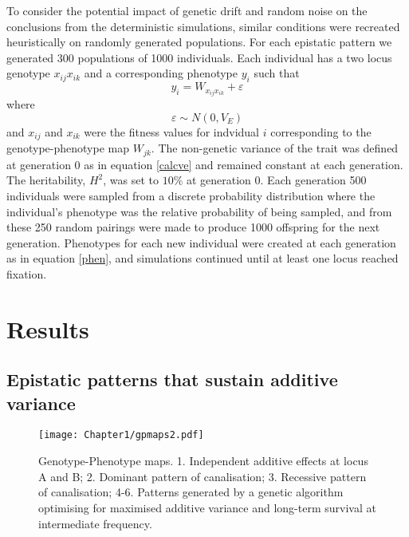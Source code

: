 To consider the potential impact of genetic drift and random noise on the conclusions from the deterministic simulations, similar conditions were recreated heuristically on randomly generated populations. For each epistatic pattern we generated 300 populations of 1000 individuals. Each individual has a two locus genotype $x_{ij}x_{ik}$ and a corresponding phenotype $y_{i}$ such that
\begin{equation}
y_i = W_{x_{ij}x_{ik}} + \varepsilon \label{phen}
\end{equation}
where
\begin{equation}
\varepsilon \sim N(0,V_E)
\end{equation}
and $x_{ij}$ and $x_{ik}$ were the fitness values for indvidual $i$ corresponding to the genotype-phenotype map $W_{jk}$. The non-genetic variance of the trait was defined at generation 0 as in equation \ref{calcve} and remained constant at each generation. The heritability, $H^2$, was set to $10\%$ at generation 0. Each generation 500 individuals were sampled from a discrete probability distribution where the individual's phenotype was the relative probability of being sampled, and from these 250 random pairings were made to produce 1000 offspring for the next generation. Phenotypes for each new individual were created  at each generation as in equation \ref{phen}, and simulations continued until at least one locus reached fixation.




\section{Results}

\subsection{Epistatic patterns that sustain additive variance}

\begin{figure}
\begin{center}
\texttt{[image: Chapter1/gpmaps2.pdf]}
\caption[Genotype phenotype maps]{Genotype-Phenotype maps. 1. Independent additive effects at locus A and B; 2. Dominant pattern of canalisation; 3. Recessive pattern of canalisation; 4-6. Patterns generated by a genetic algorithm optimising for maximised additive variance and long-term survival at intermediate frequency.}
\label{fig:gpmaps}
\end{center}
\end{figure}

